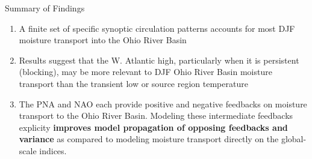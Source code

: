 \begin{block}{Summary of Findings}
    \begin{enumerate}
        \item A finite set of specific synoptic circulation patterns accounts for most DJF moisture transport into the Ohio River Basin
        \item Results suggest that the W. Atlantic high, particularly when it is persistent (blocking), may be more relevant to DJF Ohio River Basin moisture transport than the transient low or source region temperature
        \item The PNA and NAO each provide positive and negative feedbacks on moisture transport to the Ohio River Basin. Modeling these intermediate feedbacks explicity \textbf{improves model propagation of opposing feedbacks and variance} as compared to modeling moisture transport directly on the global-scale indices.
    \end{enumerate}
\end{block}
